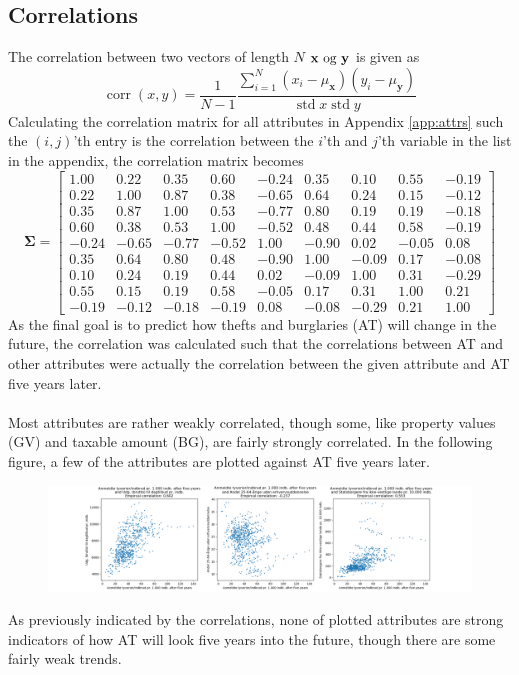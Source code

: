 \documentclass[11pt,fleqn]{article}
\numberwithin{footnote}{section}
\numberwithin{figure}{section}
\numberwithin{table}{section}
\begin{document}
\subsection{Correlations}
The correlation between two vectors of length $ N $ $ \mathbf x\textup{ og }\mathbf y $ is given as
\begin{equation*}
	\operatorname{corr}(x, y)=\frac{1}{N-1}\frac{\sum_{i=1}^{N}(x_i-\mu_{\mathbf x})(y_i-\mu_{\mathbf y})}{\operatorname{std}x\operatorname{std}y}
\end{equation*}
Calculating the correlation matrix for all attributes in Appendix \ref{app:attrs} such the $ (i, j) $'th entry is the correlation between the $ i $'th and $ j $'th variable in the list in the appendix, the correlation matrix becomes
\begin{equation*}
	\mathbf \Sigma=\begin{bmatrix}
		1.00	&	0.22	&	0.35	&	0.60	&	-0.24	&	0.35	&	0.10	&	0.55	&	-0.19\\
		0.22	&	1.00	&	0.87	&	0.38	&	-0.65	&	0.64	&	0.24	&	0.15	&	-0.12\\
		0.35	&	0.87	&	1.00	&	0.53	&	-0.77	&	0.80	&	0.19	&	0.19	&	-0.18\\
		0.60	&	0.38	&	0.53	&	1.00	&	-0.52	&	0.48	&	0.44	&	0.58	&	-0.19\\
		-0.24	&	-0.65	&	-0.77	&	-0.52	&	1.00	&	-0.90	&	0.02	&	-0.05	&	0.08\\
		0.35	&	0.64	&	0.80	&	0.48	&	-0.90	&	1.00	&	-0.09	&	0.17	&	-0.08\\
		0.10	&	0.24	&	0.19	&	0.44	&	0.02	&	-0.09	&	1.00	&	0.31	&	-0.29\\
		0.55	&	0.15	&	0.19	&	0.58	&	-0.05	&	0.17	&	0.31	&	1.00	&	0.21\\
		-0.19	&	-0.12	&	-0.18	&	-0.19	&	0.08	&	-0.08	&	-0.29	&	0.21	&	1.00
	\end{bmatrix}
\end{equation*}
As the final goal is to predict how thefts and burglaries (AT) will change in the future, the correlation was calculated such that the correlations between AT and other attributes were actually the correlation between the given attribute and AT five years later.\\
\\
Most attributes are rather weakly correlated, though some, like property values (GV) and taxable amount (BG), are fairly strongly correlated. In the following figure, a few of the attributes are plotted against AT five years later.
\begin{figure}[H]
	\centering
	\includegraphics[width=1\textwidth]{corrs}
\end{figure}\noindent
As previously indicated by the correlations, none of plotted attributes are strong indicators of how AT will look five years into the future, though there are some fairly weak trends.
\end{document}
